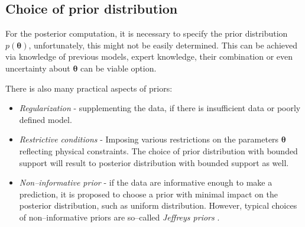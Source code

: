 \subsection{Choice of prior distribution}
For the posterior computation, it is necessary to specify the prior distribution $p(\boldsymbol{\theta})$, unfortunately, this might not be easily determined. This can be achieved via knowledge of previous models, expert knowledge, their combination or even uncertainty about $\boldsymbol{\theta}$ can be viable option. 

There is also many practical aspects of priors:
\begin{itemize}
	\item \emph{Regularization} - supplementing the data, if there is insufficient data or poorly defined model. 
	\item \emph{Restrictive conditions} - Imposing various restrictions on the parameters $\boldsymbol{\theta}$ reflecting physical constraints. The choice of prior distribution with bounded support will result to posterior distribution with bounded support as well. 
	\item \emph{Non--informative prior} - if the data are informative enough to make a prediction, it is proposed to choose a prior with minimal impact on the posterior distribution, such as uniform distribution. However, typical choices of non--informative priors are so--called \emph{Jeffreys priors} \cite{jeffrey}.
\end{itemize}



